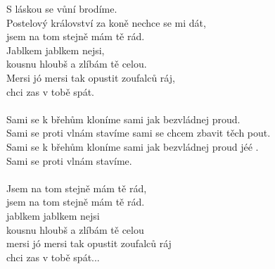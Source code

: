 S láskou se vůní brodíme. \\
Postelový království za koně nechce se mi dát,\\
jsem na tom stejně mám tě rád. \\
Jablkem jablkem nejsi, \\
kousnu hloubš a zlíbám tě celou. \\
Mersi jó mersi tak opustit zoufalců ráj, \\
chci zas v tobě spát.\\
\\
Sami se k břehům kloníme sami jak bezvládnej proud. \\
Sami se proti vlnám stavíme sami se chcem zbavit těch pout. \\
Sami se k břehům kloníme sami jak bezvládnej proud jéé .\\
Sami se proti vlnám stavíme. \\
\\
Jsem na tom stejně mám tě rád, \\
jsem na tom stejně mám tě rád. \\
jablkem jablkem nejsi \\
kousnu hloubš a zlíbám tě celou \\
mersi jó mersi tak opustit zoufalců ráj \\
chci zas v tobě spát...\\